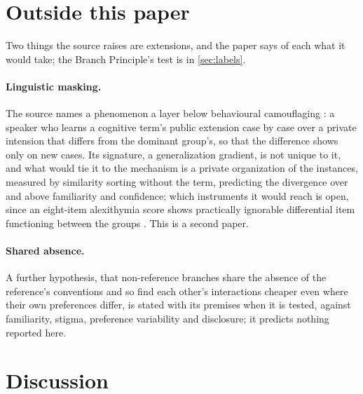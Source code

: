 \section{Outside this paper}
\label{sec:extensions}

Two things the source raises are extensions, and the paper says of each what it would take; the Branch Principle's test is in \autoref{sec:labels}.

\paragraph{Linguistic masking.} The source names a phenomenon a layer below behavioural camouflaging \cite{Hull2017, Hull2019, Pearson2021}: a speaker who learns a cognitive term's public extension case by case over a private intension that differs from the dominant group's, so that the difference shows only on new cases. Its signature, a generalization gradient, is not unique to it, and what would tie it to the mechanism is a private organization of the instances, measured by similarity sorting without the term, predicting the divergence over and above familiarity and confidence; which instruments it would reach is open, since an eight-item alexithymia score shows practically ignorable differential item functioning between the groups \cite{WilliamsGotham2021}. This is a second paper.

\paragraph{Shared absence.} A further hypothesis, that non-reference branches share the absence of the reference's conventions and so find each other's interactions cheaper even where their own preferences differ, is stated with its premises when it is tested, against familiarity, stigma, preference variability and disclosure; it predicts nothing reported here.

\section{Discussion}
\label{sec:discussion}

